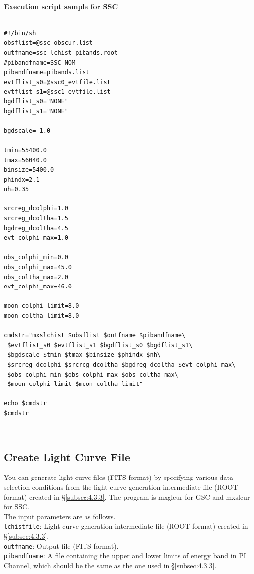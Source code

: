 \documentclass[10pt]{report}
\renewcommand{\_}{\textscale{.5}{\textbf{\textunderscore}}}
\begin{document}
\

\noindent\textbf{Execution script sample for SSC} \\

\begin{lstlisting}[frame=single]

#!/bin/sh
obsflist=@ssc_obscur.list
outfname=ssc_lchist_pibands.root
#pibandfname=SSC_NOM
pibandfname=pibands.list
evtflist_s0=@ssc0_evtfile.list
evtflist_s1=@ssc1_evtfile.list
bgdflist_s0="NONE"
bgdflist_s1="NONE"

bgdscale=-1.0

tmin=55400.0
tmax=56040.0
binsize=5400.0
phindx=2.1
nh=0.35

srcreg_dcolphi=1.0
srcreg_dcoltha=1.5
bgdreg_dcoltha=4.5
evt_colphi_max=1.0

obs_colphi_min=0.0
obs_colphi_max=45.0
obs_coltha_max=2.0
evt_colphi_max=46.0

moon_colphi_limit=8.0
moon_coltha_limit=8.0

cmdstr="mxslchist $obsflist $outfname $pibandfname\
 $evtflist_s0 $evtflist_s1 $bgdflist_s0 $bgdflist_s1\
 $bgdscale $tmin $tmax $binsize $phindx $nh\
 $srcreg_dcolphi $srcreg_dcoltha $bgdreg_dcoltha $evt_colphi_max\
 $obs_colphi_min $obs_colphi_max $obs_coltha_max\
 $moon_colphi_limit $moon_coltha_limit"

echo $cmdstr
$cmdstr

\end{lstlisting}

\

\subsection{Create Light Curve File}\label{subsec:4.3.4}

You can generate light curve files (FITS format) by specifying various data selection conditions from the light curve generation intermediate file (ROOT format) created in \S \ref{subsec:4.3.3}. The program is mxglcur for GSC and mxslcur for SSC. \\
\indent The input parameters are as follows.\\

\noindent\texttt{lchistfile}: Light curve generation intermediate file (ROOT format) created in \S \ref{subsec:4.3.3}.\\

\noindent\texttt{outfname}: Output file (FITS format).\\

\noindent\texttt{pibandfname}: A file containing the upper and lower limits of energy band in PI Channel, which should be the same as the one used in \S \ref{subsec:4.3.3}.\\
\end{document}

